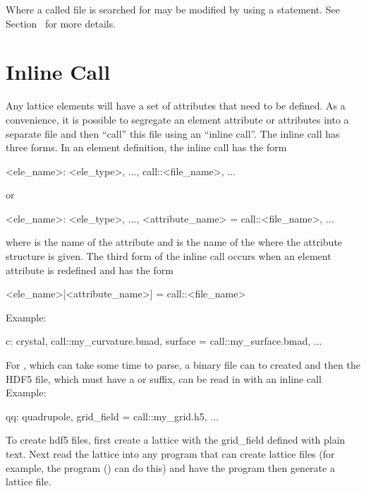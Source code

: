 {{{{{Where a called file is searched for may be modified by using a
 statement. See Section~ for
more details.

\section{Inline Call}
\label{s:call.inline}

Any lattice elements will have a set of attributes that need to be defined.  As a convenience, it is
possible to segregate an element attribute or attributes into a separate file and then ``call'' this
file using an ``inline call''. The inline call has three forms. In an element definition, the inline
call has the form
\begin{example}
  <ele_name>: <ele_type>, ..., call::<file_name>, ...
\end{example}
or
\begin{example}
  <ele_name>: <ele_type>, ..., <attribute_name> = call::<file_name>, ...
\end{example}
where  is the name of the attribute and  is the name of the
where the attribute structure is given.  The third form of the inline call occurs when an element
attribute is redefined and has the form
\begin{example}
  <ele_name>[<attribute_name>] = call::<file_name>
\end{example}
Example:
\begin{example}
  c: crystal, call::my_curvature.bmad, surface = call::my_surface.bmad, ...
\end{example}  

For , which can take some time to parse, a  binary file can to created and then
the HDF5 file, which must have a  or  suffix, can be read in with an inline call Example:
\begin{example}
  qq: quadrupole, grid_field = call::my_grid.h5, ...
\end{example}
To create hdf5 files, first create a lattice with the grid_field defined with plain text. Next read
the lattice into any program that can create \bmad lattice files (for example, the \tao program
() can do this) and have the program then generate a lattice file.

}}}}}
